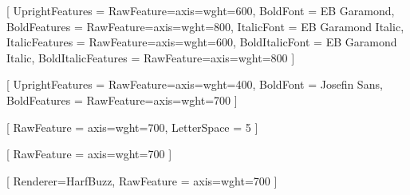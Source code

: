 \usepackage[margin=0.4in, landscape]{geometry}
\usepackage{tikz}
\usepackage{fontspec}
\usepackage{xcolor}


\setmainfont{EB Garamond}[
  UprightFeatures = {RawFeature={axis={wght=600}}},
  BoldFont = {EB Garamond},
  BoldFeatures = {RawFeature={axis={wght=800}}},
  ItalicFont = {EB Garamond Italic},
  ItalicFeatures = {RawFeature={axis={wght=600}}},
  BoldItalicFont = {EB Garamond Italic},
  BoldItalicFeatures = {RawFeature={axis={wght=800}}}
]

\setsansfont{Josefin Sans}[
  UprightFeatures = {RawFeature={axis={wght=400}}},
  BoldFont = {Josefin Sans},
  BoldFeatures = {RawFeature={axis={wght=700}}}
]

\newfontfamily{}[
  RawFeature = {axis={wght=700}},
  LetterSpace = 5
]

\newfontfamily{}[
  RawFeature = {axis={wght=700}}
]

\newfontfamily{}[
  Renderer=HarfBuzz,
  RawFeature = {axis={wght=700}}
]

\pagestyle{empty}
\setlength{\parindent}{0pt}
